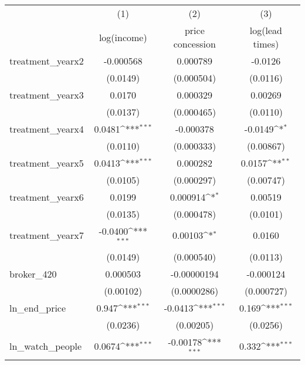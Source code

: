 {
\def\sym#1{\ifmmode^{#1}\else\(^{#1}\)\fi}
\begin{tabular}{l*{3}{c}}
\toprule
            &\multicolumn{1}{c}{(1)}&\multicolumn{1}{c}{(2)}&\multicolumn{1}{c}{(3)}\\
            &\multicolumn{1}{c}{log(income)}&\multicolumn{1}{c}{price concession}&\multicolumn{1}{c}{log(lead times)}\\
\midrule
treatment\_yearx2&   -0.000568         &    0.000789         &     -0.0126         \\
            &    (0.0149)         &  (0.000504)         &    (0.0116)         \\
\addlinespace
treatment\_yearx3&      0.0170         &    0.000329         &     0.00269         \\
            &    (0.0137)         &  (0.000465)         &    (0.0110)         \\
\addlinespace
treatment\_yearx4&      0.0481\sym{***}&   -0.000378         &     -0.0149\sym{*}  \\
            &    (0.0110)         &  (0.000333)         &   (0.00867)         \\
\addlinespace
treatment\_yearx5&      0.0413\sym{***}&    0.000282         &      0.0157\sym{**} \\
            &    (0.0105)         &  (0.000297)         &   (0.00747)         \\
\addlinespace
treatment\_yearx6&      0.0199         &    0.000914\sym{*}  &     0.00519         \\
            &    (0.0135)         &  (0.000478)         &    (0.0101)         \\
\addlinespace
treatment\_yearx7&     -0.0400\sym{***}&     0.00103\sym{*}  &      0.0160         \\
            &    (0.0149)         &  (0.000540)         &    (0.0113)         \\
\addlinespace
broker\_420  &    0.000503         & -0.00000194         &   -0.000124         \\
            &   (0.00102)         & (0.0000286)         &  (0.000727)         \\
\addlinespace
ln\_end\_price&       0.947\sym{***}&     -0.0413\sym{***}&       0.169\sym{***}\\
            &    (0.0236)         &   (0.00205)         &    (0.0256)         \\
\addlinespace
ln\_watch\_people&      0.0674\sym{***}&    -0.00178\sym{***}&       0.332\sym{***}\\

\end{tabular}}
